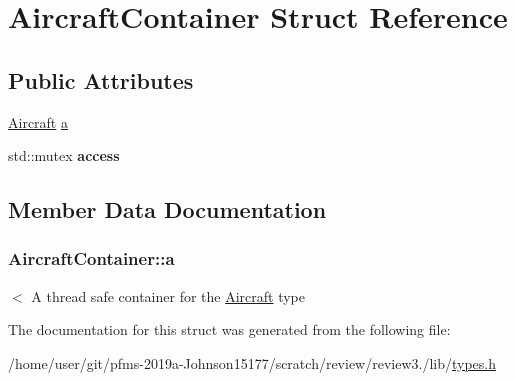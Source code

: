 \hypertarget{structAircraftContainer}{}\section{Aircraft\+Container Struct Reference}
\label{structAircraftContainer}
\subsection*{Public Attributes}
\begin{DoxyCompactItemize}
\item 
\hyperlink{structAircraft}{Aircraft} \hyperlink{structAircraftContainer_a47f37483bcb18c2b147391289df80f01}{a}
\item 
std\+::mutex {\bfseries access}\hypertarget{structAircraftContainer_a0c52481859d8864b461224958c339533}{}\label{structAircraftContainer_a0c52481859d8864b461224958c339533}

\end{DoxyCompactItemize}


\subsection{Member Data Documentation}
\subsubsection[{\texorpdfstring{a}{a}}]{ Aircraft\+Container\+::a}\hypertarget{structAircraftContainer_a47f37483bcb18c2b147391289df80f01}{}\label{structAircraftContainer_a47f37483bcb18c2b147391289df80f01}
$<$ A thread safe container for the \hyperlink{structAircraft}{Aircraft} type 

The documentation for this struct was generated from the following file\+:\begin{DoxyCompactItemize}
\item 
/home/user/git/pfms-\/2019a-\/\+Johnson15177/scratch/review/review3./lib/\hyperlink{types_8h}{types.\+h}\end{DoxyCompactItemize}
